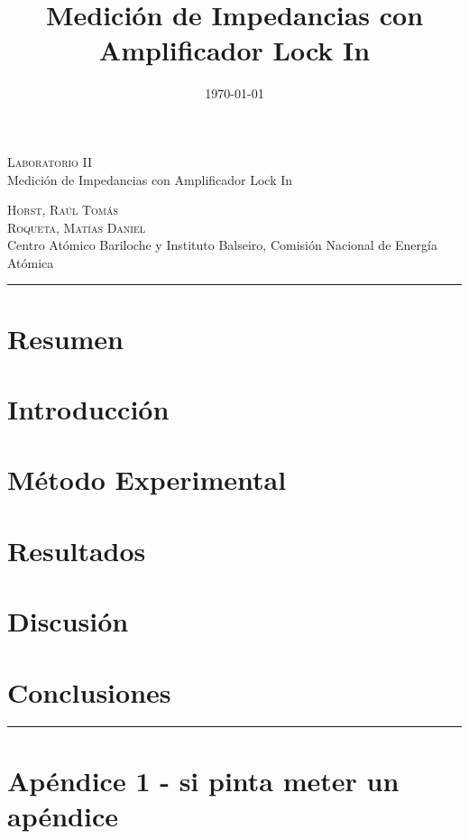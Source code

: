 \documentclass[11pt,a4paper]{extarticle}
\date{\small{\today}}
\begin{document}
\title{Medición de Impedancias con Amplificador Lock In}
	\LARGE{\textsc{Laboratorio II}}\\
	\Large{Medición de Impedancias con Amplificador Lock In}\\
\begin{large}
\small\textsc{Horst, Raúl Tomás}\\
\small\textsc{Roqueta, Matías Daniel}\\
\small{Centro Atómico Bariloche y Instituto Balseiro, Comisión Nacional de Energía Atómica}\\
\end{large}
\setcounter{page}{1}

\chead{}

\rfoot{\thepage} 
\renewcommand{\headrulewidth}{0.4pt} 
\renewcommand{\footrulewidth}{0.4pt} 
\pagestyle{fancy}

\hrule
\begin{multicols}{2}
\normalsize
\section{Resumen}

\section{Introducción}

\section{Método Experimental}

\section{Resultados}

\section{Discusión}

\section{Conclusiones}




\end{multicols}
\newpage
\begin{appendices}
\vspace{-1em}
\hrule
\vspace{1em}
\normalsize
\section{Apéndice 1 - si pinta meter un apéndice}
\end{appendices}
\end{document}
